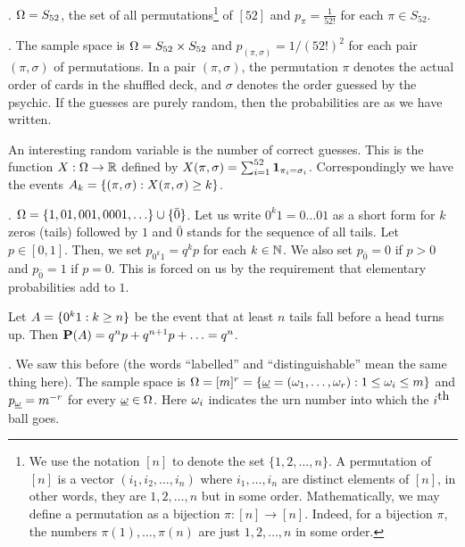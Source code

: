 \documentclass[preprint,  11pt]{amsart}
\def\omeg{\underline{\ome}}
\def\sig{{\sigma}}
\begin{document}
\begin{example} . $\Ome=S_{52}$, the set of all permutations\footnote{We use the notation $[n]$ to denote the set $\{1,2,\ldots ,n\}$. A permutation of $[n]$ is a vector $(i_{1},i_{2},\ldots ,i_{n})$ where $i_{1},\ldots ,i_{n}$ are distinct elements of $[n]$, in other words, they are $1,2,\ldots ,n$ but in some order. Mathematically, we may define a permutation as a bijection $\pi:[n]\to [n]$. Indeed, for a bijection $\pi$, the numbers $\pi(1),\ldots ,\pi(n)$ are just $1,2,\ldots ,n$ in some order.} of $[52]$ and $p_{\pi}=\frac{1}{52!}$ for each $\pi\in S_{52}$.
\end{example}

\beg {}. The sample space is $\Ome=S_{52}\times S_{52}$ and $p_{(\pi,\sig)}=1/(52!)^{2}$ for each pair $(\pi,\sig)$ of permutations. In a pair $(\pi,\sig)$, the permutation $\pi$ denotes the actual order of  cards in the shuffled deck, and $\sig$ denotes the order guessed by the psychic. If the guesses are purely random, then the probabilities are as we have written.

An interesting random variable is the number of correct guesses. This is the function $X:\Ome\to \R$ defined by $X(\pi,\sig)=\sum_{i=1}^{52}\one_{\pi_{i}=\sig_{i}}$. Correspondingly we have the events $A_{k}=\{(\pi,\sig)\suchthat X(\pi,\sig)\ge k\}$.
\eeg

\begin{example} . $\Ome=\{1,01,001,0001,\ldots \}\cup\{\bar{0}\}$. Let us write $0^{k}1=0\ldots01$ as a short form for $k$ zeros (tails) followed by $1$ and $\bar{0}$ stands for the sequence of all tails. Let $p\in [0,1]$. Then, we set $p_{0^{k}1}=q^{k}p$ for each $k\in \N$. We also set $p_{\bar{0}}=0$ if $p>0$ and $p_{\bar{0}}=1$ if $p=0$. This is forced on us by the requirement that elementary probabilities add to $1$.

Let $A=\{0^{k}1\suchthat k\ge n\}$ be the event that at least $n$ tails fall before a head turns up. Then $\P(A)=q^{n}p+q^{n+1}p+\ldots =q^{n}$.
\end{example}

\begin{example} . We saw this before (the words ``labelled'' and ``distinguishable'' mean the same thing here). The sample space is $\Ome=[m]^{r}=\{\omeg=(\ome_{1},\ldots ,\ome_{r})\suchthat 1\le \ome_{i}\le m\}$ and $p_{\omeg}=m^{-r}$ for every $\omeg\in \Ome$. Here $\ome_{i}$ indicates the urn number into which the $i^{\mb{th}}$ ball goes.
\end{example}
\end{document}
